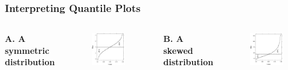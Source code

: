 \documentclass[aspectratio=1610]{beamer}
\begin{document}
\begin{frame}
	\frametitle{Interpreting Quantile Plots}
	\begin{columns}
		\textbf{A. A symmetric distribution}

		\begin{figure}
			\begin{center}
				\includegraphics[width=0.95\textwidth]{figures/symmtric_qplot.png}
			\end{center}
		\end{figure}
		\textbf{B. A skewed distribution}

		\begin{figure}
			\begin{center}
				\includegraphics[width=0.95\textwidth]{figures/skewed_qplot.png}
			\end{center}
		\end{figure}
	\end{columns}
\end{frame}
\end{document}
